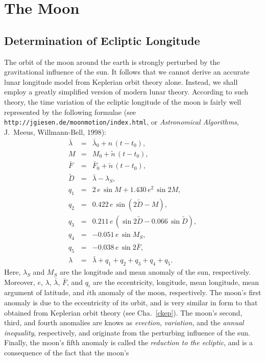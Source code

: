 \chapter{The Moon}\label{cmoon}
\section{Determination of Ecliptic Longitude}
The orbit of the moon around the earth is strongly perturbed by the 
gravitational influence of the sun. It follows that we cannot derive an accurate lunar longitude model
from Keplerian orbit theory alone. Instead, we shall employ a
greatly simplified version of modern lunar theory. According to such
theory, the time variation of the ecliptic longitude of the moon is fairly
well represented by the following
formulae (see {\tt http://jgiesen.de/moonmotion/index.html}, or {\em Astronomical Algorithms}, J.~Meeus, Willmann-Bell, 1998):
\begin{eqnarray}
\bar{\lambda} &=&\bar{\lambda}_0  + n\,(t-t_0),\\[0.5ex]
M &=& M_0 + \tilde{n}\,(t-t_0),\\[0.5ex]
\bar{F} &=& \bar{F}_0 + \breve {n}\,(t-t_0),\\[0.5ex]
\tilde{D} &=& \bar{\lambda} - \lambda_S,\\[0.5ex]
q_1 &=& 2\,e\,\sin M + 1.430\,e^2\,\sin 2M,\\[0.5ex]
q_2 &=& 0.422\,e\,\sin (2\tilde{D} - M),\\[0.5ex]
q_3 &=& 0.211\,e\,(\sin 2\tilde{D} - 0.066\,\sin \tilde{D}),\\[0.5ex]
q_4 &=& -0.051\,e\,\sin M_S,\\[0.5ex]
q_5&=& -0.038\,e\,\sin 2 \bar{F},\\[0.5ex]
\lambda &=& \bar{\lambda} + q_1+q_2+q_3+q_4+q_5.
\end{eqnarray}
Here, $\lambda_S$ and $M_S$ are the longitude and mean anomaly
of the sun, respectively. Moreover, $e$, $\lambda$, $\bar{\lambda}$, $\bar{F}$,
and $q_i$ are the eccentricity, longitude, mean longitude, mean argument of latitude,
and $i$th anomaly of the moon, respectively. The moon's first anomaly
is due to the eccentricity of its orbit, and is very similar in form to that obtained from Keplerian orbit theory (see Cha.~\ref{ckep}). The
moon's second, third, and fourth anomalies are knows as
{\em evection}, {\em variation}, and the {\em annual inequality}, respectively, and originate from
the perturbing influence of the sun. Finally, the moon's fifth anomaly is
called the {\em reduction to the ecliptic}, and is a consequence of the fact that the moon's

